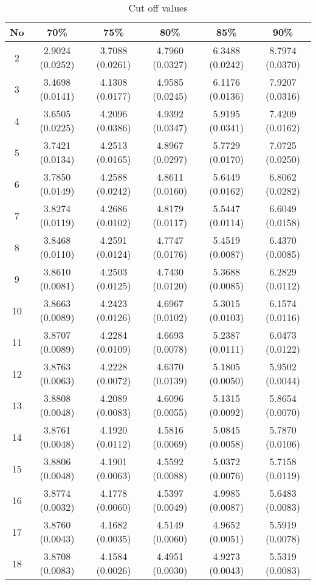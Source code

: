 \begin{table}[H]
\centering
\caption{Cut off values}
\label{tab:var_cut_off_values}

\small
\begin{tabular}{c|c|c|c|c|c}
No  & 70\%            &75\%             &80\%             &85\%             &90\%\\
\hline
2   &2.9024 (0.0252)  &3.7088 (0.0261)  &4.7960 (0.0327)  &6.3488 (0.0242)  &8.7974 (0.0370)\\
3   &3.4698 (0.0141)  &4.1308 (0.0177)  &4.9585 (0.0245)  &6.1176 (0.0136)  &7.9207 (0.0316)\\
4   &3.6505 (0.0225)  &4.2096 (0.0386)  &4.9392 (0.0347)  &5.9195 (0.0341)  &7.4209 (0.0162)\\
5   &3.7421 (0.0134)  &4.2513 (0.0165)  &4.8967 (0.0297)  &5.7729 (0.0170)  &7.0725 (0.0250)\\
6   &3.7850 (0.0149)  &4.2588 (0.0242)  &4.8611 (0.0160)  &5.6449 (0.0162)  &6.8062 (0.0282)\\
7   &3.8274 (0.0119)  &4.2686 (0.0102)  &4.8179 (0.0117)  &5.5447 (0.0114)  &6.6049 (0.0158)\\
8   &3.8468 (0.0110)  &4.2591 (0.0124)  &4.7747 (0.0176)  &5.4519 (0.0087)  &6.4370 (0.0085)\\
9   &3.8610 (0.0081)  &4.2503 (0.0125)  &4.7430 (0.0120)  &5.3688 (0.0085)  &6.2829 (0.0112)\\
10  &3.8663 (0.0089)  &4.2423 (0.0126)  &4.6967 (0.0102)  &5.3015 (0.0103)  &6.1574 (0.0116)\\
11  &3.8707 (0.0089)  &4.2284 (0.0109)  &4.6693 (0.0078)  &5.2387 (0.0111)  &6.0473 (0.0122)\\
12  &3.8763 (0.0063)  &4.2228 (0.0072)  &4.6370 (0.0139)  &5.1805 (0.0050)  &5.9502 (0.0044)\\
13  &3.8808 (0.0048)  &4.2089 (0.0083)  &4.6096 (0.0055)  &5.1315 (0.0092)  &5.8654 (0.0070)\\
14  &3.8761 (0.0048)  &4.1920 (0.0112)  &4.5816 (0.0069)  &5.0845 (0.0058)  &5.7870 (0.0106)\\
15  &3.8806 (0.0048)  &4.1901 (0.0063)  &4.5592 (0.0088)  &5.0372 (0.0076)  &5.7158 (0.0119)\\
16  &3.8774 (0.0032)  &4.1778 (0.0060)  &4.5397 (0.0049)  &4.9985 (0.0087)  &5.6483 (0.0083)\\
17  &3.8760 (0.0043)  &4.1682 (0.0035)  &4.5149 (0.0060)  &4.9652 (0.0051)  &5.5919 (0.0078)\\
18  &3.8708 (0.0083)  &4.1584 (0.0026)  &4.4951 (0.0030)  &4.9273 (0.0043)  &5.5319 (0.0083)\\

\end{tabular}
\end{table}
